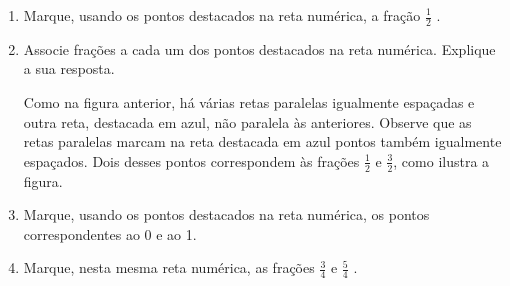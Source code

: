 \begin{enumerate} [\quad a)] %
  \item     Marque, usando os pontos destacados na reta numérica, a fração     $\frac{1}{2}$    . 
  \item     Associe frações a cada um dos pontos destacados na reta numérica. Explique a sua resposta.    \mbox{} \newline      
\begin{center}
\end{center}

Como na figura anterior, há várias retas paralelas igualmente espaçadas e outra reta, destacada em azul, não paralela às anteriores. Observe que as retas paralelas marcam na reta destacada em azul pontos também igualmente espaçados. Dois desses pontos correspondem às frações $\frac{1}{2}$ e $\frac{3}{2}$, como ilustra a figura. 

  \item     Marque, usando os pontos destacados na reta numérica, os pontos correspondentes ao 0 e ao 1.
  \item     Marque, nesta mesma reta numérica, as frações     $\frac{3}{4}$     e     $\frac{5}{4}$    .
\begin{center}
\end{center}

\end{enumerate} %

